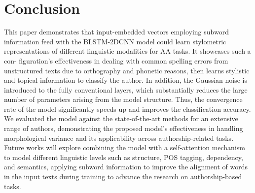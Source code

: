 \documentclass[conference]{IEEEtran}
\begin{document}
\section{Conclusion}\label{sec5}
This paper demonstrates that input-embedded vectors employing subword information feed with the BLSTM-2DCNN model could learn stylometric representations of different linguistic modalities for AA tasks. It showcases such a con- figuration’s effectiveness in dealing with common spelling errors from unstructured texts due to orthography and phonetic reasons, then learns stylistic and topical information to classify the author. In addition, the Gaussian noise is introduced to the fully conventional layers, which substantially reduces the large number of parameters arising from the model structure. Thus, the convergence rate of the model significantly speeds up and improves the classification accuracy. We evaluated the model against the state-of-the-art methods for an extensive range of authors, demonstrating the proposed model’s effectiveness in handling morphological variance and its applicability across authorship-related tasks. Future works will explore combining the model with a self-attention mechanism to model different linguistic levels such as structure, POS tagging, dependency, and semantics, applying subword information to improve the alignment of words in the input texts during training to advance the research on authorship-based tasks. 


\end{document}
